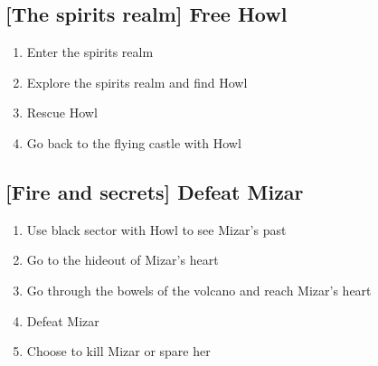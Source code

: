 \subsection{[The spirits realm] Free Howl}
\begin{enumerate}
\item Enter the spirits realm
\item Explore the spirits realm and find Howl
\item Rescue Howl
\item Go back to the flying castle with Howl
\end{enumerate}

\subsection{[Fire and secrets] Defeat Mizar}
\begin{enumerate}
\item Use black sector with Howl to see Mizar’s past
\item Go to the hideout of Mizar’s heart
\item Go through the bowels of the volcano and reach Mizar’s heart
\item Defeat Mizar
\item Choose to kill Mizar or spare her
\end{enumerate}
